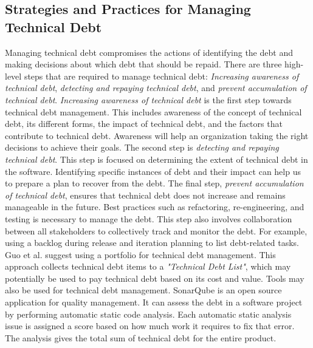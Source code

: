 \subsection{Strategies and Practices for Managing Technical Debt}
Managing technical debt compromises the actions of identifying the debt and making decisions about which debt that should be repaid\cite{fowler1999refactoring,krutchen,Zazworka:2011:PDD:1985362.1985372}. There are three high-level steps that are required to manage technical debt\cite{suryanarayana2014refactoring}: \textit{Increasing awareness of technical debt}, \textit{detecting and repaying technical debt}, and \textit{prevent accumulation of technical debt}. \textit{Increasing awareness of technical debt} is the first step towards technical debt management. This includes awareness of the concept of technical debt, its different forms, the impact of technical debt, and the factors that contribute to technical debt. Awareness will help an organization taking the right decisions to achieve their goals. The second step is \textit{detecting and repaying technical debt}. This step is focused on determining the extent of technical debt in the software. Identifying specific instances of debt and their impact can help us to prepare a plan to recover from the debt. The final step, \textit{prevent accumulation of technical debt}, ensures that technical debt does not increase and remains manageable in the future. Best practices such as refactoring, re-engineering, and testing is necessary to manage the debt\cite{p8-codabux}. This step also involves collaboration between all stakeholders to collectively track and monitor the debt. For example, using a backlog during release and iteration planning to list debt-related tasks\cite{krutchen}. Guo et al.\cite{p31-guo} suggest using a portfolio for technical debt management. This approach collects technical debt items to a \textit{"Technical Debt List"}, which may potentially be used to pay technical debt based on its cost and value. Tools may also be used for technical debt management. SonarQube is an open source application for quality management\cite{sonarsource2013sonarqube}. It can assess the debt in a software project by performing automatic static code analysis. Each automatic static analysis issue is assigned a score based on how much work it requires to fix that error. The analysis gives the total sum of technical debt for the entire product.







